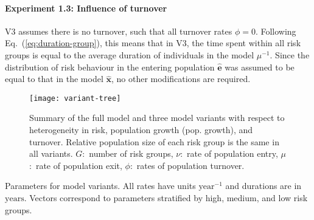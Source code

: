 \paragraph{Experiment 1.3: Influence of turnover}\label{p:exp-1-turnover}
V3 assumes there is no turnover, such that 
all turnover rates $\phi = 0$.
Following Eq.~(\ref{eq:duration-group}),
this means that in V3, the time spent within all risk groups is 
equal to the average duration of individuals in the model $\mu^{-1}$.
Since the distribution of risk behaviour in the entering population $\bm{\hat{e}}$		
was assumed to be equal to that in the model $\bm{\hat{x}}$,
no other modifications are required.

\begin{figure}
  \centering
  \texttt{[image: variant-tree]}
  \caption{Summary of the full model and three model variants
    with respect to heterogeneity in risk, population growth (pop. growth), and turnover.
    Relative population size of each risk group is the same in all variants.
    $G$:~number of risk groups,
    $\nu$:~rate of population entry,
    $\mu$:~rate of population exit,
    $\phi$:~rates of population turnover.}
  \label{fig:variant-tree}
\end{figure}
\begin{table}
  \centering
  \caption{Parameters for model variants.
    All rates have units $\mathrm{year}^{-1}$ and durations are in $\mathrm{years}$.
    Vectors correspond to parameters stratified by high, medium, and low risk groups.}
  \label{tab:params-variants}
  
\end{table}

